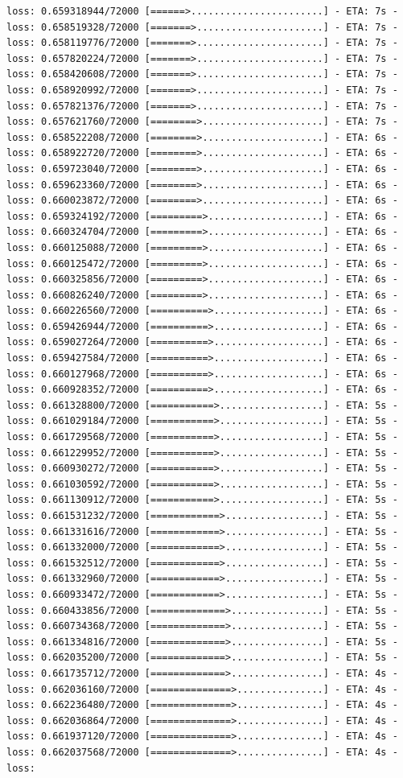 \documentclass[12pt,fleqn]{article}\usepackage{../../common}
\begin{document}
\begin{verbatim}
loss: 0.659318944/72000 [======>.......................] - ETA: 7s - loss: 0.658519328/72000 [=======>......................] - ETA: 7s - loss: 0.658119776/72000 [=======>......................] - ETA: 7s - loss: 0.657820224/72000 [=======>......................] - ETA: 7s - loss: 0.658420608/72000 [=======>......................] - ETA: 7s - loss: 0.658920992/72000 [=======>......................] - ETA: 7s - loss: 0.657821376/72000 [=======>......................] - ETA: 7s - loss: 0.657621760/72000 [========>.....................] - ETA: 7s - loss: 0.658522208/72000 [========>.....................] - ETA: 6s - loss: 0.658922720/72000 [========>.....................] - ETA: 6s - loss: 0.659723040/72000 [========>.....................] - ETA: 6s - loss: 0.659623360/72000 [========>.....................] - ETA: 6s - loss: 0.660023872/72000 [========>.....................] - ETA: 6s - loss: 0.659324192/72000 [=========>....................] - ETA: 6s - loss: 0.660324704/72000 [=========>....................] - ETA: 6s - loss: 0.660125088/72000 [=========>....................] - ETA: 6s - loss: 0.660125472/72000 [=========>....................] - ETA: 6s - loss: 0.660325856/72000 [=========>....................] - ETA: 6s - loss: 0.660826240/72000 [=========>....................] - ETA: 6s - loss: 0.660226560/72000 [==========>...................] - ETA: 6s - loss: 0.659426944/72000 [==========>...................] - ETA: 6s - loss: 0.659027264/72000 [==========>...................] - ETA: 6s - loss: 0.659427584/72000 [==========>...................] - ETA: 6s - loss: 0.660127968/72000 [==========>...................] - ETA: 6s - loss: 0.660928352/72000 [==========>...................] - ETA: 6s - loss: 0.661328800/72000 [===========>..................] - ETA: 5s - loss: 0.661029184/72000 [===========>..................] - ETA: 5s - loss: 0.661729568/72000 [===========>..................] - ETA: 5s - loss: 0.661229952/72000 [===========>..................] - ETA: 5s - loss: 0.660930272/72000 [===========>..................] - ETA: 5s - loss: 0.661030592/72000 [===========>..................] - ETA: 5s - loss: 0.661130912/72000 [===========>..................] - ETA: 5s - loss: 0.661531232/72000 [============>.................] - ETA: 5s - loss: 0.661331616/72000 [============>.................] - ETA: 5s - loss: 0.661332000/72000 [============>.................] - ETA: 5s - loss: 0.661532512/72000 [============>.................] - ETA: 5s - loss: 0.661332960/72000 [============>.................] - ETA: 5s - loss: 0.660933472/72000 [============>.................] - ETA: 5s - loss: 0.660433856/72000 [=============>................] - ETA: 5s - loss: 0.660734368/72000 [=============>................] - ETA: 5s - loss: 0.661334816/72000 [=============>................] - ETA: 5s - loss: 0.662035200/72000 [=============>................] - ETA: 5s - loss: 0.661735712/72000 [=============>................] - ETA: 4s - loss: 0.662036160/72000 [==============>...............] - ETA: 4s - loss: 0.662236480/72000 [==============>...............] - ETA: 4s - loss: 0.662036864/72000 [==============>...............] - ETA: 4s - loss: 0.661937120/72000 [==============>...............] - ETA: 4s - loss: 0.662037568/72000 [==============>...............] - ETA: 4s - loss: 
\end{verbatim}
\end{document}
